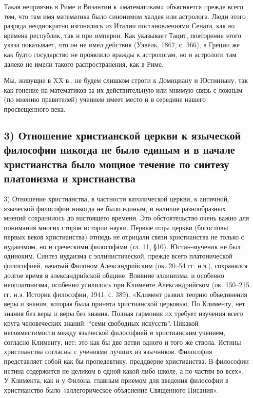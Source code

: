 Такая неприязнь в  Риме и Византии к  «математикам» объясняется прежде
всего тем, что там имя математика было синонимом халдея или астролога.
Люди этого  разряда неоднократно изгонялись из  Италии постановлениями
Сената, как  во времена  республик, так и  при империи.  Как указывает
Тацит,  повторение этого  указа показывает,  что он  не имел  действия
(Уэвель, 1867, с. 366), в Греции же как будто государство не проявляло
вражды  к  астрологам, но  и  астрологи  там  далеко не  имели  такого
распространения, как в Риме.

Мы, живущие в XX в., не  будем слишком строги к Домициану и Юстиниану,
так как гонение на математиков за их действительную или мнимую связь с
ложным (по мнению правителей) учением  имеет место и в середине нашего
просвещенного века.

\subsection{3)  Отношение христианской  церкви  к языческой  философии
никогда не было единым и в  начале христианства было мощное течение по
синтезу платонизма и христианства}

3)  Отношение   христианства,  в  частности  католической   церкви,  к
античной,  языческой  философии  никогда  не было  единым,  и  наличие
разнообразных   мнений   сохранилось   до  настоящего   времени.   Это
обстоятельство очень важно для  понимания многих сторон истории науки.
Первые  отцы церкви  (богословы первых  веков христианства)  отнюдь не
отрицали связи  христианства не  только с  иудаизмом, но  и греческими
философами  (гл.  11,  §10).  Юстин-мученик не  был  одиноким.  Синтез
иудаизма  с эллинистической,  прежде  всего платонической  философией,
начатый  Филоном Александрийским  (ок.  20--54  гг. н.э.),  сохранялся
долгое время  в александрийской общине. Влияние  эллинизма, и особенно
неоплатонизма,  особенно усилилось  при Клименте  Александрийском (ок.
150--215 гг.  н.э. История философии,  1941, с. 389).  «Климент развил
теорию объединения  веры и  знания, которая была  принята христианской
церковью.  По  Клименту,  нет  знания  без веры  и  веры  без  знания.
Полная гармония  их требует изучения всего  круга человеческих знаний:
``семи свободных  искусств''. Никакой несовместимости  между языческой
философией и христианским учением, согласно  Клименту, нет: это как бы
две  ветви одного  и того  же ствола.  Истины христианства  согласны с
учениями  лучших из  язычников.  Философия представляет  собой как  бы
пропедевтику, преддверие  христианства. В философии  истина содержится
не целиком в одной какой-либо школе, а по частям во всех». У Климента,
как и у Филона, главным  приемом для введения философии в христианство
было «аллегорическое объяснение Священного Писания».

